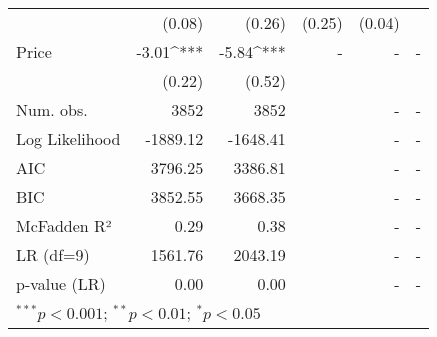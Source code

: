 \begin{table}[h]
\begin{center}
\begin{tabular}{l D{.}{.}{5.5} D{.}{.}{5.5} D{.}{.}{2.5} D{.}{.}{2.5} D{.}{.}{3.2}}
                                   & (0.08)      & (0.26)      & (0.25)      & (0.04)     &        \\
Price                              & -3.01^{***} & -5.84^{***} &  -          &  -         &  -     \\
                                   & (0.22)      & (0.52)      &             &            &        \\
\midrule
Num. obs.                          & 3852        & 3852        &             & -          &  -     \\
Log Likelihood                     & -1889.12    & -1648.41    &             & -          &  -     \\
AIC                                & 3796.25     & 3386.81     &             & -          &  -     \\
BIC                                & 3852.55     & 3668.35     &             & -          &  -     \\
McFadden R²                        & 0.29        & 0.38        &             & -          &  -     \\
LR  (df=9)                       & 1561.76     & 2043.19     &             & -          &  -     \\
p-value (LR)                       & 0.00        & 0.00        &             & -          &  -     \\
\bottomrule
{}
\end{tabular}

\end{center}
\end{table}
